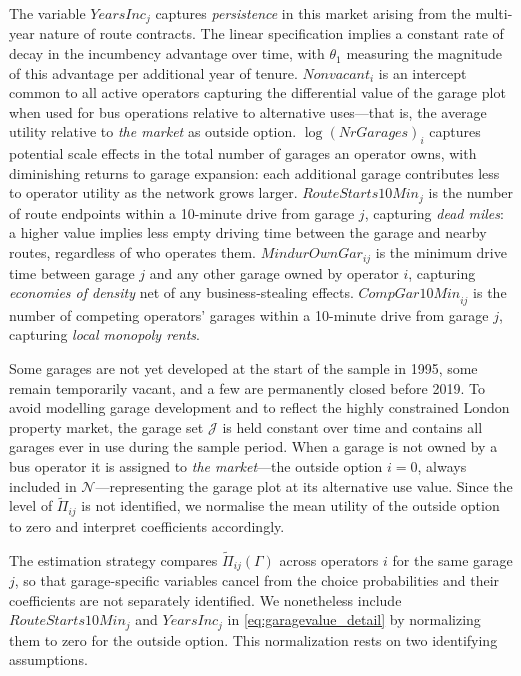 \documentclass[12pt]{article}
\begin{document}
The variable $\textit{YearsInc}_{j}$ captures \emph{persistence} in 
this market arising from the multi-year nature of route contracts. The linear 
specification implies a constant rate of decay in the incumbency advantage 
over time, with $\theta_1$ measuring the magnitude of this advantage per 
additional year of tenure. $\textit{Nonvacant}_i$ is an intercept common to all active operators capturing 
the differential value of the garage plot when used for bus operations relative 
to alternative uses---that is, the average utility relative to \emph{the 
market} as outside option. $\log(\textit{NrGarages})_i$ captures potential scale effects in the total number of 
garages an operator owns, with diminishing returns to garage expansion: each 
additional garage contributes less to operator utility as the network grows 
larger. $\textit{RouteStarts10Min}_{j}$ is the number of route endpoints within a 
10-minute drive from garage $j$, capturing \emph{dead miles}: a higher value 
implies less empty driving time between the garage and nearby routes, regardless 
of who operates them. $\textit{MindurOwnGar}_{ij}$ is the minimum drive time 
between garage $j$ and any other garage owned by operator $i$, capturing 
\emph{economies of density} net of any business-stealing effects. 
$\textit{CompGar10Min}_{ij}$ is the number of competing operators' garages 
within a 10-minute drive from garage $j$, capturing \emph{local monopoly 
rents}. 

Some garages are not yet developed at the start of the sample in 1995, some 
remain temporarily vacant, and a few are permanently closed before 2019. To 
avoid modelling garage development and to reflect the highly constrained London 
property market, the garage set $\mathcal{J}$ is held constant over time and 
contains all garages ever in use during the sample period. When a garage is not 
owned by a bus operator it is assigned to \emph{the market}---the outside 
option $i=0$, always included in $\mathcal{N}$---representing the garage plot 
at its alternative use value. Since the level of $\tilde{\Pi}_{ij}$ is not 
identified, we normalise the mean utility of the outside option to zero and 
interpret coefficients accordingly.

The estimation strategy compares $\tilde{\Pi}_{ij}(\Gamma)$ across operators 
$i$ for the same garage $j$, so that garage-specific variables cancel from 
the choice probabilities and their coefficients are not separately identified. 
We nonetheless include $\textit{RouteStarts10Min}_{j}$ 
and $\textit{YearsInc}_{j}$ in \eqref{eq:garagevalue_detail} by normalizing 
them to zero for the outside option. This normalization rests on two 
identifying assumptions.
\end{document}
